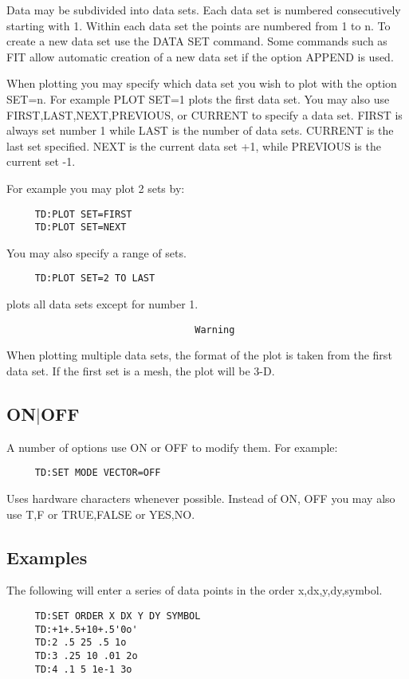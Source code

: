 Data  may  be  subdivided  into  data  sets.   Each  data set is numbered
consecutively starting with 1.  Within  each  data  set  the  points  are
numbered from 1 to n.  To create a new data set use the DATA SET command.
Some commands such as FIT allow automatic creation of a new data  set  if
the option APPEND is used.  

When  plotting  you  may specify which data set you wish to plot with the
option SET=n.  For example PLOT SET=1 plots the first data set.  You  may
also  use  FIRST,LAST,NEXT,PREVIOUS,  or  CURRENT  to specify a data set.
FIRST is always set number 1 while LAST  is  the  number  of  data  sets.
CURRENT  is  the  last  set  specified.  NEXT is the current data set +1,
while PREVIOUS is the current set -1.  

For example you may plot 2 sets by:  
\begin{verbatim}
     TD:PLOT SET=FIRST 
     TD:PLOT SET=NEXT 
\end{verbatim}
You may also specify a range of sets.  
\begin{verbatim}
     TD:PLOT SET=2 TO LAST 
\end{verbatim}
plots all data sets except for number 1.  
\begin{verbatim}
                                 Warning
\end{verbatim}
When  plotting  multiple  data sets, the format of the plot is taken from
the first data set.  If the first set is a mesh, the plot will be 3-D.  
\subsection{ON$|$OFF}
A number of options use ON or OFF to modify them.  For example:  
\begin{verbatim}
     TD:SET MODE VECTOR=OFF 
\end{verbatim}
Uses  hardware  characters whenever possible.  Instead of ON, OFF you may
also use T,F or TRUE,FALSE or YES,NO.  
\subsection{Examples}
The   following  will  enter  a  series  of  data  points  in  the  order
x,dx,y,dy,symbol.  
\begin{verbatim}
     TD:SET ORDER X DX Y DY SYMBOL 
     TD:+1+.5+10+.5'0o' 
     TD:2 .5 25 .5 1o 
     TD:3 .25 10 .01 2o 
     TD:4 .1 5 1e-1 3o 
\end{verbatim}
